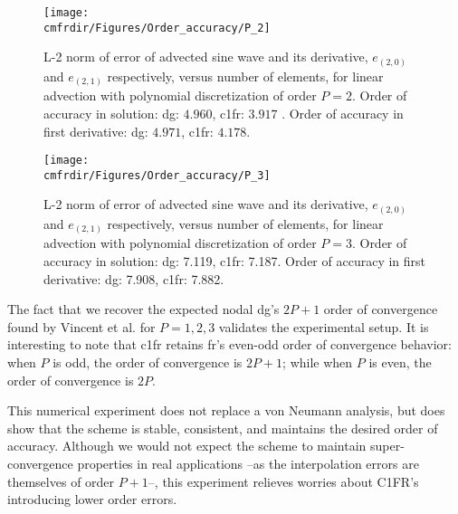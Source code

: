 \begin{figure}[h]
\centering\texttt{[image: \\cmfrdir/Figures/Order\_accuracy/P\_2]}
\caption{L-2 norm of error of advected sine wave and its derivative, $e_{(2,0)}$ and $e_{(2,1)}$ respectively, versus number of elements, for linear advection with polynomial discretization of order $P = 2$. Order of accuracy in solution: \gls{dg}: $4.960$, \gls{c1fr}:  $3.917$ . Order of accuracy in first derivative: \gls{dg}: $4.971$, \gls{c1fr}: $4.178$.}
\label{fig:adv_P2}
\end{figure}

\begin{figure}[h]
\centering\texttt{[image: \\cmfrdir/Figures/Order\_accuracy/P\_3]}
\caption{L-2 norm of error of advected sine wave and its derivative, $e_{(2,0)}$ and $e_{(2,1)}$ respectively, versus number of elements, for linear advection with polynomial discretization of order $P = 3$. Order of accuracy in solution: \gls{dg}: 7.119, \gls{c1fr}: 7.187. Order of accuracy in first derivative: \gls{dg}: 7.908, \gls{c1fr}: 7.882.}
\label{fig:adv_P3}
\end{figure}

The fact that we recover the expected nodal \gls{dg}'s $2P+1$ order of convergence found by Vincent et al. \cite{vincent2011insights} for $P = 1,2,3$ validates the experimental setup. It is interesting to note that \gls{c1fr} retains \gls{fr}'s even-odd order of convergence behavior: when $P$ is odd, the order of convergence is $2P+1$; while when $P$ is even, the order of convergence is $2P$.

This numerical experiment does not replace a von Neumann analysis, but does show that the scheme is stable, consistent, and maintains the desired order of accuracy. Although we would not expect the scheme to maintain super-convergence properties in real applications --as the interpolation errors are themselves of order $P+1$--, this experiment relieves worries about C1FR's introducing lower order errors.